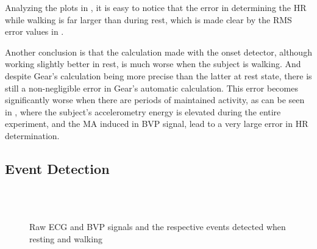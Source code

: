 Analyzing the plots in , it is easy to notice that the error in determining the HR while walking is far larger than during rest, which is made clear by the RMS error values in . 

Another conclusion is that the calculation made with the onset detector, although working slightly better in rest, is much worse when the subject is walking. And despite Gear's calculation being more precise than the latter at rest state, there is still a non-negligible error in Gear's automatic calculation. This error becomes significantly worse when there are periods of maintained activity, as can be seen in , where the subject's accelerometry energy is elevated during the entire experiment, and the MA induced in BVP signal, lead to a very large error in HR determination.


\FloatBarrier
\pagebreak

\subsection{Event Detection}

\begin{figure}[!h]
	\centering
	\\
	\\
	\caption{Raw ECG and BVP signals and the respective events detected when resting and walking}
	\label{fig:events}
\end{figure}


